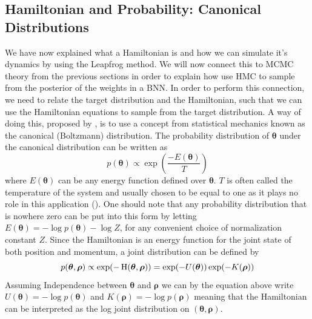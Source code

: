 \subsection{Hamiltonian and Probability: Canonical Distributions}
We have now explained what a Hamiltonian is and how we can simulate it's dynamics by using the Leapfrog method. We will now connect this to MCMC theory from the previous sections in order to explain how use HMC to sample from the posterior of the weights in a BNN. In order to perform this connection, we need to relate the target distribution and the Hamiltonian, such that we can use the Hamiltonian equations to sample from the target distribution. A way of doing this, proposed by \cite{neal2012bayesian}, is to use a concept from statistical mechanics known as the canonical (Boltzmann) distribution. The probability distribution of $\boldsymbol{\theta}$ under the canonical distribution can be written as
\begin{equation*}
    p(\boldsymbol{\theta})\propto \exp\left(\frac{-E(\boldsymbol{\theta})}{T}\right)
\end{equation*}
where $E(\boldsymbol{\theta})$ can be any energy function defined over $\boldsymbol{\theta}$. $T$ is often called the temperature of the system and usually chosen to be equal to one as it plays no role in this application (\cite{neal2012bayesian}).
One should note that any probability distribution that is nowhere zero can be put into this form by letting $E(\boldsymbol{\theta})=-\log p(\boldsymbol{\theta})-\log Z$, for any convenient choice of normalization constant $Z$. Since the Hamiltonian is an energy function for the joint state of both position and momentum, a joint distribution can be defined by
\begin{equation*}
p(\boldsymbol{\theta},\boldsymbol{\rho})\propto \exp(-\operatorname{H}(\boldsymbol{\theta},\boldsymbol{\rho}))   = \exp(-U(\boldsymbol{\theta}))\exp(-K(\boldsymbol{\rho}))
\end{equation*}
Assuming Independence between $\boldsymbol{\theta}$ and $\boldsymbol{\rho}$ we can by the equation above write $U(\boldsymbol{\theta})=-\log p(\boldsymbol{\theta})$ and $K(\boldsymbol{\rho})=-\log p(\boldsymbol{\rho})$ meaning that the Hamiltonian can be interpreted as the log joint distribution on $(\boldsymbol{\theta},\boldsymbol{\rho})$. 
\\
\\
